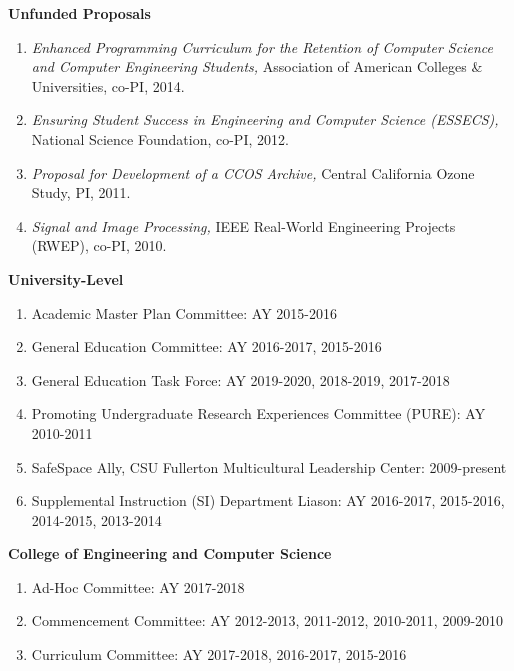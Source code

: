 \documentclass[11pt]{letter}
\begin{document}
\textbf{Unfunded Proposals}
\begin{enumerate}
\item \emph{Enhanced Programming Curriculum for the Retention of Computer Science and Computer Engineering Students,} Association of American Colleges \& Universities, co-PI, 2014.
\item \emph{Ensuring Student Success in Engineering and Computer Science (ESSECS),} National Science Foundation, co-PI, 2012.
\item \emph{Proposal for Development of a CCOS Archive,} Central California Ozone Study, PI, 2011.
\item \emph{Signal and Image Processing,} IEEE Real-World Engineering Projects (RWEP), co-PI, 2010.
\end{enumerate}


\textbf{University-Level}
\begin{enumerate}
\item Academic Master Plan Committee: AY 2015-2016
\item General Education Committee: AY 2016-2017, 2015-2016
\item General Education Task Force: AY 2019-2020, 2018-2019, 2017-2018
\item Promoting Undergraduate Research Experiences Committee (PURE): AY 2010-2011
\item SafeSpace Ally, CSU Fullerton Multicultural Leadership Center: 2009-present
\item Supplemental Instruction (SI) Department Liason: AY 2016-2017, 2015-2016, 2014-2015, 2013-2014
\end{enumerate}

\textbf{College of Engineering and Computer Science}
\begin{enumerate}
\item Ad-Hoc Committee: AY 2017-2018
\item Commencement Committee: AY 2012-2013, 2011-2012, 2010-2011, 2009-2010
\item Curriculum Committee: AY 2017-2018, 2016-2017, 2015-2016
\end{enumerate}
\end{document}
